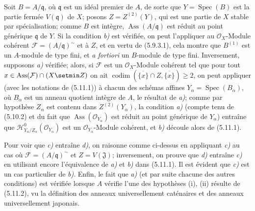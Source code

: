 Soit $B=A/\mathfrak q$, où $\mathfrak q$ est un idéal premier de $A$, de sorte
que $Y=\operatorname{Spec}(B)$ est la partie fermée $V(\mathfrak q)$ de $X$;
posons $Z=Z^{(2)}(Y)$, qui est une partie de $X$ stable par spécialisation;
comme $B$ est intègre, $\operatorname{Ass}(A/\mathfrak q)$ est réduit au point
générique $\mathfrak q$ de $Y$. Si la condition \emph{b)} est vérifiée, on peut
l'appliquer au $\mathcal O_X$-Module cohérent
$\mathcal F=(A/\mathfrak q)^\sim$ et à $Z$, et en vertu de (5.9.3.1), cela
montre que $B^{(1)}$ est un $A$-module de type fini, et \emph{a fortiori} un
$B$-module de type fini. Inversement, supposons \emph{a)} vérifiée; alors, si
$\mathcal F$ est un $\mathcal O_X$-Module cohérent tel que pour tout
$x\in\operatorname{Ass}(\mathcal F)\cap(X\setmin Z)$ on ait
$\operatorname{codim}(\overline{\{x\}}\cap Z,\overline{\{x\}})\geq2$, on peut
appliquer (avec les notations de (5.11.1)) à chacun des schémas affines
$Y_\alpha=\operatorname{Spec}(B_\alpha)$, où $B_\alpha$ est un anneau quotient
intègre de $A$, le résultat de \emph{a)}; comme par hypothèse $Z_\alpha$ est contenu
dans $Z^{(2)}(Y_\alpha)$, la condition \emph{a)} (compte tenu de (5.10.2)
et du fait que $\operatorname{Ass}(\mathcal O_{Y_\alpha})$ est réduit au point
générique de $Y_\alpha$) entraîne que
$\mathcal H^0_{Y_\alpha/Z_\alpha}(\mathcal O_{Y_\alpha})$ est un
$\mathcal O_{Y_\alpha}$-Module cohérent, et \emph{b)} découle alors de (5.11.1).

Pour voir que \emph{c)} entraîne \emph{d)}, on raisonne comme ci-dessus en appliquant \emph{c)} au
cas où $\mathcal F=(A/\mathfrak q)^\sim$ et $Z=V(\mathfrak J)$;
inversement, on prouve que \emph{d)} entraîne \emph{c)} en utilisant encore l'équivalence de
\emph{a)} et \emph{b)} dans (5.11.1). Il est évident que \emph{c)} est un cas particulier de \emph{b)}.
Enfin, le fait que \emph{a)} (et par suite chacune des autres conditions) est vérifiée
lorsque $A$ vérifie l'une des hypothèses (i), (ii) résulte de (5.11.2), vu la
définition des anneaux universellement caténaires et des anneaux
universellement japonais.

